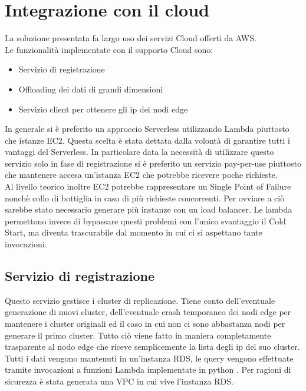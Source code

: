 \documentclass[conference]{IEEEtran}
\begin{document}
\section{Integrazione con il cloud}
La soluzione presentata fa largo uso dei servizi Cloud offerti da AWS.\\Le funzionalità implementate con il supporto Cloud
sono:
\begin{itemize}
  \item{Servizio di registrazione}
  \item{Offloading dei dati di grandi dimensioni}
  \item{Servizio client per ottenere gli ip dei nodi edge}
\end{itemize}

In generale si è preferito un approccio Serverless utilizzando Lambda piuttosto che istanze EC2. Questa scelta è stata dettata
dalla volontà di garantire tutti i vantaggi del Serverless. In particolare data la necessità di utilizzare questo servizio solo
in fase di registrazione si è preferito un servizio pay-per-use piuttosto che mantenere accesa un'istanza EC2 che potrebbe
ricevere poche richieste.\\
Al livello teorico inoltre EC2 potrebbe rappresentare un Single Point of Failure nonchè collo di bottiglia in caso di più
richieste concorrenti. Per ovviare a ciò sarebbe stato necessario generare più instanze con un load balancer.
Le lambda permettono invece di bypassare questi problemi con l'unico svantaggio il Cold Start, ma diventa trascurabile
dal momento in cui ci si aspettano tante invocazioni.

\subsection{Servizio di registrazione}
Questo servizio gestisce i cluster di replicazione. Tiene conto dell'eventuale generazione di nuovi cluster, dell'eventuale
crash temporaneo dei nodi edge per mantenere i cluster originali ed il caso in cui non ci sono abbastanza nodi per generare
il primo cluster. Tutto ciò viene fatto in maniera completamente trasparente al nodo edge che riceve semplicemente la lista
degli ip del suo cluster.\\
Tutti i dati vengono mantenuti in un'instanza RDS, le query vengono effettuate tramite invocazioni a funzioni Lambda implementate
in python . Per ragioni di sicurezza è stata generata una VPC in cui vive l'instanza RDS.
\end{document}
